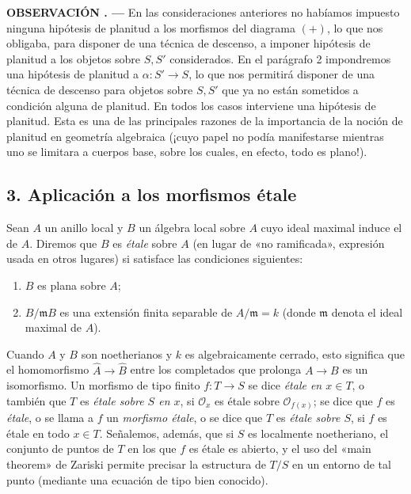 \documentclass[11pt,twoside,openany]{book}
\numberwithin{equation}{section}
\newcommand{\src}[1]{%
  \phantomsection\hypertarget{src:#1}{}%
  \marginpar{\raggedleft\footnotesize\sffamily #1}%
}
\theoremstyle{plain}
\theoremstyle{definition}
\theoremstyle{remark}
\newcommand{\result}[2]{%
  \par\medskip\noindent\textbf{#1%
  \if\relax\detokenize{#2}\relax\else\space#2\fi. ---}\enspace
}
\newcommand{\FgaUnitKey}{frontmatter}
\renewcommand{\src}[1]{%
  \phantomsection\hypertarget{src:\FgaUnitKey:#1}{}%
  \marginpar{\raggedleft\footnotesize\sffamily #1}%
}
\theoremstyle{plain}
\theoremstyle{definition}
\theoremstyle{remark}
\begin{document}
\result{OBSERVACIÓN}{} En las consideraciones anteriores no habíamos impuesto
ninguna hipótesis de planitud a los morfismos del diagrama $(+)$, lo que nos
obligaba, para disponer de una técnica de descenso, a imponer hipótesis de
planitud a los objetos sobre $S,S'$ considerados. En el parágrafo 2 impondremos
una hipótesis de planitud a $\alpha:S'\longrightarrow S$, lo que nos permitirá
disponer de una técnica de descenso para objetos sobre $S,S'$ que ya no están
sometidos a condición alguna de planitud. En todos los casos interviene una
hipótesis de planitud. Esta es una de las principales razones de la importancia
de la noción de planitud en geometría algebraica (¡cuyo papel no podía
manifestarse mientras uno se limitara a cuerpos base, sobre los cuales, en
efecto, todo es plano!).

\src{308}
\subsection*{3. Aplicación a los morfismos étale}

Sean $A$ un anillo local y $B$ un álgebra local sobre $A$ cuyo ideal maximal
induce el de $A$. Diremos que $B$ es \emph{étale} sobre $A$ (en lugar de
«no ramificada», expresión usada en otros lugares) si satisface las condiciones
siguientes:
\begin{enumerate}
\item[(i)] $B$ es plana sobre $A$;
\item[(ii)] $B/\mathfrak mB$ es una extensión finita separable de
$A/\mathfrak m=k$ (donde $\mathfrak m$ denota el ideal maximal de $A$).
\end{enumerate}
Cuando $A$ y $B$ son noetherianos y $k$ es algebraicamente cerrado, esto
significa que el homomorfismo $\widehat A\longrightarrow\widehat B$ entre los
completados que prolonga $A\longrightarrow B$ es un isomorfismo. Un morfismo de
tipo finito $f:T\longrightarrow S$ se dice \emph{étale en $x\in T$}, o también
que $T$ es \emph{étale sobre $S$ en $x$}, si $\mathcal O_x$ es étale sobre
$\mathcal O_{f(x)}$; se dice que $f$ es \emph{étale}, o se llama a $f$ un
\emph{morfismo étale}, o se dice que $T$ es \emph{étale sobre $S$}, si $f$ es
étale en todo $x\in T$. Señalemos, además, que si $S$ es localmente
noetheriano, el conjunto de puntos de $T$ en los que $f$ es étale es abierto, y
el uso del «main theorem» de Zariski permite precisar la estructura de $T/S$
en un entorno de tal punto (mediante una ecuación de tipo bien conocido).
\end{document}
